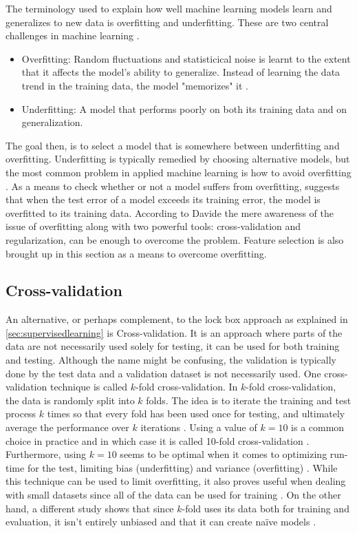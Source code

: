 	The terminology used to explain how well machine learning models learn and generalizes to new data is overfitting and underfitting. These are two central challenges in machine learning \cite{BOOK:1}. 
\begin{itemize}
	\item{Overfitting:} Random fluctuations and statisticical noise is learnt to the extent that it affects the model's ability to generalize. Instead of learning the data trend in the training data, the model "memorizes" it \cite{ARTICLE:4}.  
	\item{Underfitting:} A model that performs poorly on both its training data and on generalization. 
\end{itemize}
The goal then, is to select a model that is somewhere between underfitting and overfitting. Underfitting is typically remedied by choosing alternative models, but the most common problem in applied machine learning is how to avoid overfitting \cite{WEBSITE:8}. As a means to check whether or not a model suffers from overfitting, \cite{IP:7} suggests that when the test error of a model exceeds its training error, the model is overfitted to its training data. %
According to Davide \cite{ARTICLE:4}  the mere awareness of the issue of overfitting along with two powerful tools: cross-validation and regularization, can be enough to overcome the problem. Feature selection is also brought up in this section as a means to overcome overfitting.

	\subsection{Cross-validation} 
	 An alternative, or perhaps complement, to the lock box approach as explained in \ref{sec:supervisedlearning} is Cross-validation. It is an approach where parts of the data are not necessarily used solely for testing, it can be used for both training and testing. Although the name might be confusing, the validation is typically done by the test data and a validation dataset is not necessarily used. One cross-validation technique is called $k$-fold cross-validation. In $k$-fold cross-validation, the data is randomly split into $k$ folds. The idea is to iterate the training and test process $k$ times so that every fold has been used once for testing, and ultimately average the performance over $k$ iterations . Using a value of $k = 10$ is a common choice in practice and in which case it is called 10-fold cross-validation \cite{ARTICLE:4}. Furthermore, using $k=10$ seems to be optimal when it comes to optimizing run-time for the test, limiting bias (underfitting) and variance (overfitting) \cite{BOOK:4}. While this technique can be used to limit overfitting, it also proves useful when dealing with small datasets since all of the data can be used for training \cite{ARTICLE:4}.  On the other hand, a different study shows that since $k$-fold uses its data both for training and evaluation, it isn't entirely unbiased and that it can create naïve models \cite{ARTICLE:25}.


